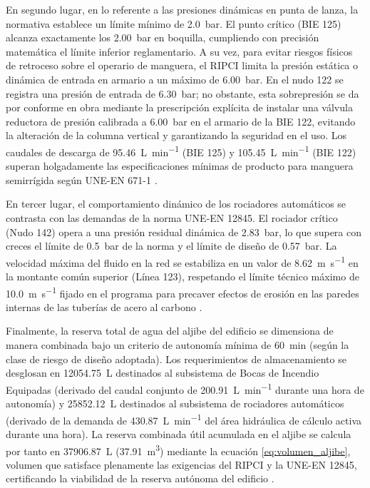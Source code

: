 \documentclass[12pt,a4paper]{article}
\begin{document}
En segundo lugar, en lo referente a las presiones dinámicas en punta de lanza, la normativa establece un límite mínimo de \SI{2.0}{\bar}. El punto crítico (BIE 125) alcanza exactamente los \SI{2.00}{\bar} en boquilla, cumpliendo con precisión matemática el límite inferior reglamentario. A su vez, para evitar riesgos físicos de retroceso sobre el operario de manguera, el RIPCI limita la presión estática o dinámica de entrada en armario a un máximo de \SI{6.00}{\bar}. En el nudo 122 se registra una presión de entrada de \SI{6.30}{\bar}; no obstante, esta sobrepresión se da por conforme en obra mediante la prescripción explícita de instalar una válvula reductora de presión calibrada a \SI{6.00}{\bar} en el armario de la BIE 122, evitando la alteración de la columna vertical y garantizando la seguridad en el uso. Los caudales de descarga de \SI{95.46}{\liter\per\minute} (BIE 125) y \SI{105.45}{\liter\per\minute} (BIE 122) superan holgadamente las especificaciones mínimas de producto para manguera semirrígida según UNE-EN 671-1 \parencite{UNE_EN_671_1}.

En tercer lugar, el comportamiento dinámico de los rociadores automáticos se contrasta con las demandas de la norma UNE-EN 12845. El rociador crítico (Nudo 142) opera a una presión residual dinámica de \SI{2.83}{\bar}, lo que supera con creces el límite de \SI{0.5}{\bar} de la norma y el límite de diseño de \SI{0.57}{\bar}. La velocidad máxima del fluido en la red se estabiliza en un valor de \SI{8.62}{\meter\per\second} en la montante común superior (Línea 123), respetando el límite técnico máximo de \SI{10.0}{\meter\per\second} fijado en el programa para precaver efectos de erosión en las paredes internas de las tuberías de acero al carbono \parencite{UNE_EN_12845}. 

Finalmente, la reserva total de agua del aljibe del edificio se dimensiona de manera combinada bajo un criterio de autonomía mínima de \SI{60}{\minute} (según la clase de riesgo de diseño adoptada). Los requerimientos de almacenamiento se desglosan en \SI{12054.75}{\liter} destinados al subsistema de Bocas de Incendio Equipadas (derivado del caudal conjunto de \SI{200.91}{\liter\per\minute} durante una hora de autonomía) y \SI{25852.12}{\liter} destinados al subsistema de rociadores automáticos (derivado de la demanda de \SI{430.87}{\liter\per\minute} del área hidráulica de cálculo activa durante una hora). La reserva combinada útil acumulada en el aljibe se calcula por tanto en \SI{37906.87}{\liter} (\SI{37.91}{\meter\cubed}) mediante la ecuación \ref{eq:volumen_aljibe}, volumen que satisface plenamente las exigencias del RIPCI y la UNE-EN 12845, certificando la viabilidad de la reserva autónoma del edificio \parencite{RIPCI_GUIA_2022,UNE_EN_12845}.
\end{document}
